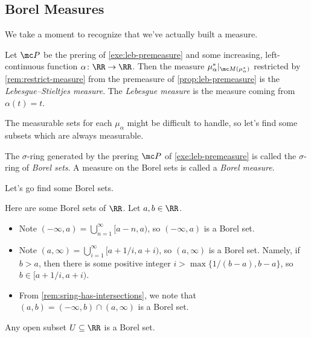 \documentclass[../notes.tex]{subfiles}
\begin{document}
\subsection{Borel Measures}
We take a moment to recognize that we've actually built a measure.
\begin{definition}
	Let $\mc P$ be the prering of \autoref{exe:leb-premeasure} and some increasing, left-continuous function $\alpha\colon\RR\to\RR$. Then the measure $\mu_\alpha^*|_{\mc M(\mu_\alpha^*)}$ restricted by \autoref{rem:restrict-measure} from the premeasure of \autoref{prop:leb-premeasure} is the \textit{Lebesgue--Stieltjes measure}. The \textit{Lebesgue measure} is the measure coming from $\alpha(t)=t$.
\end{definition}
The measurable sets for each $\mu_\alpha$ might be difficult to handle, so let's find some subsets which are always measurable.
\begin{definition}
	The $\sigma$-ring generated by the prering $\mc P$ of \autoref{exe:leb-premeasure} is called the $\sigma$-ring of \textit{Borel sets}. A measure on the Borel sets is called a \textit{Borel measure}.
\end{definition}
Let's go find some Borel sets.
\begin{example} \label{ex:intervals-are-borel}
	Here are some Borel sets of $\RR$. Let $a,b\in\RR$.
	\begin{itemize}
		\item Note $(-\infty,a)=\bigcup_{n=1}^\infty[a-n,a)$, so $(-\infty,a)$ is a Borel set.
		\item Note $(a,\infty)=\bigcup_{i=1}^\infty[a+1/i,a+i)$, so $(a,\infty)$ is a Borel set. Namely, if $b>a$, then there is some positive integer $i>\max\{1/(b-a),b-a\}$, so $b\in[a+1/i,a+i)$.
		\item From \autoref{rem:sring-has-intersections}, we note that $(a,b)=(-\infty,b)\cap(a,\infty)$ is a Borel set.
	\end{itemize}
\end{example}
\begin{exe} \label{exe:open-is-borel}
	Any open subset $U\subseteq\RR$ is a Borel set.
\end{exe}
\end{document}
